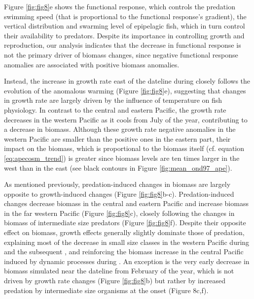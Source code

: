Figure \ref{fig:fig8}e shows the functional response, which controls the predation swimming speed (that is proportional to the functional response's gradient), the vertical distribution and swarming level of epipelagic fish, which in turn control their availability to predators.  Despite its importance in controlling growth and reproduction, our analysis indicates that the decrease in functional response is not the primary driver of biomass changes, since negative functional response anomalies are associated with positive biomass anomalies.

Instead, the increase in growth rate east of the dateline during \nino{} closely follows the evolution of the anomalous warming (Figure \ref{fig:fig8}e), suggesting that changes in growth rate are largely driven by the influence of temperature on fish physiology. In contrast to the central and eastern Pacific, the growth rate decreases in the western Pacific as it cools from July of the \nino{} year, contributing to a decrease in biomass. Although these growth rate negative anomalies in the western Pacific are smaller than the positive ones in the eastern part, their impact on the biomass, which is proportional to the biomass itself (cf. equation \ref{eq:apecosm_trend}) is greater since biomass levels are ten times larger in the west than in the east (see black contours in Figure \ref{fig:mean_ond97_ape}).

As mentioned previously, predation-induced changes in biomass are largely opposite to growth-induced changes  (Figure \ref{fig:fig8}b-c). Predation-induced changes decrease biomass in the central and eastern Pacific and increase biomass in the far western Pacific (Figure \ref{fig:fig8}c), closely following the changes in biomass of intermediate size predators (Figure \ref{fig:fig8}f). Despite their opposite effect on biomass, growth effects generally slightly dominate those of predation, explaining most of the decrease in small size classes in the western Pacific during \nino{} and the subsequent \nina{}, and reinforcing the biomass increase in the central Pacific induced by dynamic processes during \nino{}. An exception is the very early decrease in biomass simulated near the dateline from February of the \nino{} year, which is not driven by growth rate changes (Figure \ref{fig:fig8}b) but rather by increased predation by intermediate size organisms at the \nino{} onset (Figure 8c,f).

